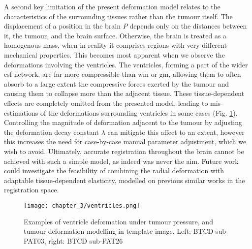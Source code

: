 A second key limitation of the present deformation model relates to the characteristics of the surrounding tissues rather than the tumour itself.
The displacement of a position in the brain $P$ depends only on the distances between it, the tumour, and the brain surface.
Otherwise, the brain is treated as a homogenous mass, when in reality it comprises regions with very different mechanical properties.
This becomes most apparent when we observe the deformations involving the ventricles.
The ventricles, forming a part of the wider \gls{csf} network, are far more compressible than \gls{wm} or \gls{gm}, allowing them to often absorb to a large extent the compressive forces exerted by the tumour and causing them to collapse more than the adjacent tissue.
These tissue-dependent effects are completely omitted from the presented model, leading to mis-estimations of the deformations surrounding ventricles in some cases (Fig. \ref{fig:ventricles}).
Controlling the magnitude of deformation adjacent to the tumour by adjusting the deformation decay constant $\lambda$ can mitigate this affect to an extent, however this increases the need for case-by-case manual parameter adjustment, which we wish to avoid.
Ultimately, accurate registration throughout the brain cannot be achieved with such a simple model, as indeed was never the aim.
Future work could investigate the feasibility of combining the radial deformation with adaptable tissue-dependent elasticity, modelled on previous similar works in the registration space.\autocite{Rohde2003,Duay2004}

\begin{figure}[htb!]
  \texttt{[image: chapter\_3/ventricles.png]}
  \caption{Examples of ventricle deformation under tumour pressure, and tumour deformation modelling in template image. Left: BTCD sub-PAT03, right: BTCD sub-PAT26}
  \label{fig:ventricles}
\end{figure}
